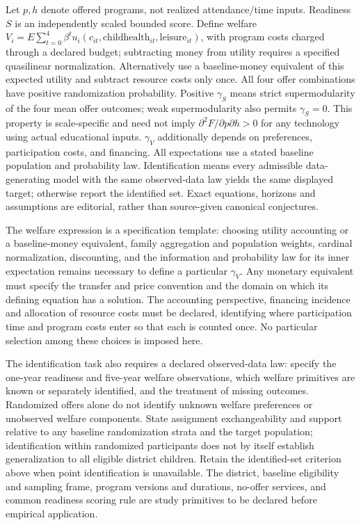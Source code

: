 \documentclass[11pt,a4paper]{article}
\begin{document}
Let \(p,h\) denote offered programs, not realized attendance/time inputs. Readiness \(S\) is an independently scaled bounded score. Define welfare \(V_i=E\sum_{t=0}^{4}\beta^tu_i(c_{it},\text{childhealth}_{it},\text{leisure}_{it})\), with program costs charged through a declared budget; subtracting money from utility requires a specified quasilinear normalization. Alternatively use a baseline-money equivalent of this expected utility and subtract resource costs only once. All four offer combinations have positive randomization probability. Positive \(\gamma_S\) means strict supermodularity of the four mean offer outcomes; weak supermodularity also permits \(\gamma_S=0\). This property is scale-specific and need not imply \(\partial^2F/\partial p\partial h>0\) for any technology using actual educational inputs. \(\gamma_V\) additionally depends on preferences, participation costs, and financing. All expectations use a stated baseline population and probability law. Identification means every admissible data-generating model with the same observed-data law yields the same displayed target; otherwise report the identified set. Exact equations, horizons and assumptions are editorial, rather than source-given canonical conjectures.

The welfare expression is a specification template: choosing utility accounting or a baseline-money equivalent, family aggregation and population weights, cardinal normalization, discounting, and the information and probability law for its inner expectation remains necessary to define a particular \(\gamma_V\). Any monetary equivalent must specify the transfer and price convention and the domain on which its defining equation has a solution. The accounting perspective, financing incidence and allocation of resource costs must be declared, identifying where participation time and program costs enter so that each is counted once. No particular selection among these choices is imposed here.

The identification task also requires a declared observed-data law: specify the one-year readiness and five-year welfare observations, which welfare primitives are known or separately identified, and the treatment of missing outcomes. Randomized offers alone do not identify unknown welfare preferences or unobserved welfare components. State assignment exchangeability and support relative to any baseline randomization strata and the target population; identification within randomized participants does not by itself establish generalization to all eligible district children. Retain the identified-set criterion above when point identification is unavailable. The district, baseline eligibility and sampling frame, program versions and durations, no-offer services, and common readiness scoring rule are study primitives to be declared before empirical application.
\end{document}
